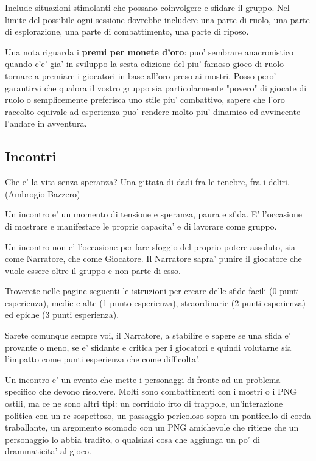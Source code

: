 \documentclass[a4paper,11pt,twoside,openany]{dndbook}
\begin{document}
Include situazioni stimolanti che possano coinvolgere e sfidare il gruppo.
Nel limite del possibile ogni sessione dovrebbe includere una parte di ruolo, una parte di esplorazione, una parte di combattimento, una parte di riposo.

\bigskip

Una nota riguarda i \textbf{premi per monete d'oro}: puo' sembrare anacronistico quando c'e' gia' in sviluppo la sesta edizione del piu' famoso gioco di ruolo tornare a premiare i giocatori in base all'oro preso ai mostri. Posso pero' garantirvi che qualora il vostro gruppo sia particolarmente "povero" di giocate di ruolo o semplicemente preferisca uno stile piu' combattivo, sapere che l'oro raccolto equivale ad esperienza puo' rendere molto piu' dinamico ed avvincente l'andare in avventura.

\subsection{Incontri}


\begin{quotebox}
{Che e' la vita senza speranza? Una gittata di dadi fra le tenebre, fra i deliri. (Ambrogio Bazzero)}
\end{quotebox}

\label{incontri}

Un incontro e' un momento di tensione e speranza, paura e sfida. E' l'occasione di mostrare e manifestare le proprie capacita' e di lavorare come gruppo.

Un incontro non e' l'occasione per fare sfoggio del proprio potere assoluto, sia come Narratore, che come Giocatore. Il Narratore sapra' punire il giocatore che vuole essere oltre il gruppo e non parte di esso.

Troverete nelle pagine seguenti le istruzioni per creare delle sfide facili (0 punti esperienza), medie e alte (1 punto esperienza), straordinarie (2 punti esperienza) ed epiche (3 punti esperienza).

Sarete comunque sempre voi, il Narratore, a stabilire e sapere se una sfida e' provante o meno, se e' sfidante e critica per i giocatori e quindi volutarne sia l'impatto come punti esperienza che come difficolta'.

Un incontro e' un evento che mette i personaggi di fronte ad un problema specifico che devono risolvere. Molti sono combattimenti con i mostri o i PNG ostili, ma ce ne sono altri tipi: un corridoio irto di trappole, un'interazione politica con un re sospettoso, un passaggio pericoloso sopra un ponticello di corda traballante, un argomento scomodo con un PNG amichevole che ritiene che un personaggio lo abbia tradito, o qualsiasi cosa che aggiunga un po' di drammaticita' al gioco.
\end{document}
